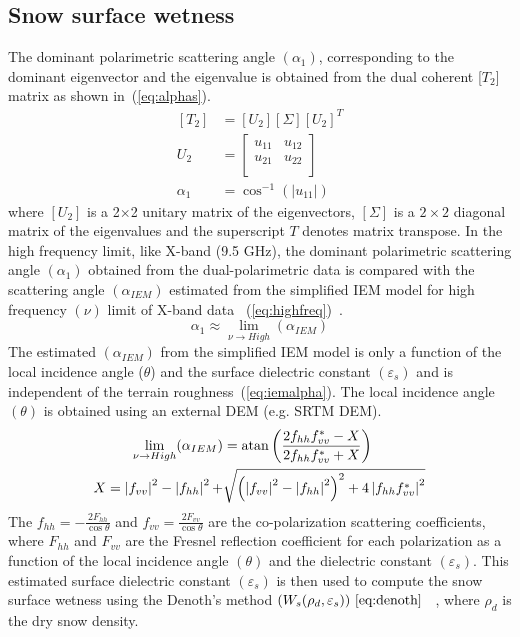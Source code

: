 \subsection{Snow surface wetness}
The dominant polarimetric scattering angle $(\alpha_1)$, corresponding to the dominant eigenvector and the eigenvalue is obtained from the dual coherent [$T_2$] matrix as shown in~(\ref{eq:alphas}).
\begin{equation}
\begin{split}
[T_2] &= [U_2][\Sigma][U_2]^{T} \\
U_2 &= \left[ \begin{array}{ccc}
u_{11} & u_{12} \\
u_{21} & u_{22} \\
\end{array} \right] \\
\alpha_1 &= \cos ^{ - 1}(|u_{11}|) 
\end{split}
\label{eq:alphas}
\end{equation}
where $[U_2]$ is a 2$\times$2 unitary matrix of the eigenvectors, $[\Sigma]$ is a $2\times2$ diagonal matrix of the eigenvalues and the superscript $T$ denotes matrix transpose. In the high frequency limit, like X-band (9.5 GHz), the dominant polarimetric scattering angle $(\alpha_1)$ obtained from the dual-polarimetric data is compared with the scattering angle $(\alpha_{IEM})$ estimated from the simplified IEM model for high frequency $(\nu)$ limit of X-band data ~(\ref{eq:highfreq})~\citep{allain2003}. 
\begin{equation}
\alpha_1 \approx \lim\limits_{\nu \rightarrow High}(\alpha_{IEM}) 
\label{eq:highfreq}
\end{equation}
The estimated $(\alpha_{IEM})$ from the simplified IEM model is only a function of the local incidence angle ($\theta$) and the surface dielectric constant $(\varepsilon_s)$ and is independent of the terrain roughness~(\ref{eq:iemalpha}). The local incidence angle $(\theta)$ is obtained using an external DEM (e.g. SRTM DEM).
\begin{equation}
\begin{split}
\lim\limits_{\nu \rightarrow High} (\alpha_{IEM}) &= \operatorname{atan}\left( \frac{2f_{hh}f_{vv}^{*}-X}{2f_{hh}f_{vv}^{*}+X}\right) \\
X = \left|f_{vv}\right|^2 - \left|f_{hh}\right|^2 + &\sqrt{\left(\left|f_{vv}\right|^2 - \left|f_{hh}\right|^2\right)^2 + 4\left|f_{hh}f_{vv}^{*}\right|^2}
\end{split}
\label{eq:iemalpha}
\end{equation}
The $f_{hh}=-\frac{2F_{hh}}{\cos\theta}$ and $f_{vv}=\frac{2F_{vv}}{\cos\theta}$ are the co-polarization scattering coefficients, where $F_{hh}$ and $F_{vv}$ are the Fresnel reflection coefficient for each polarization as a function of the local incidence angle $(\theta)$ and the dielectric constant $(\varepsilon_s)$. This estimated surface dielectric constant $(\varepsilon_s)$ is then used to compute the snow surface wetness using the Denoth's method $(W_s (\rho_d,\varepsilon_s))~\eqref{eq:denoth}~$~\citep{denoth1995electron}, where $\rho_d$ is the dry snow density.


